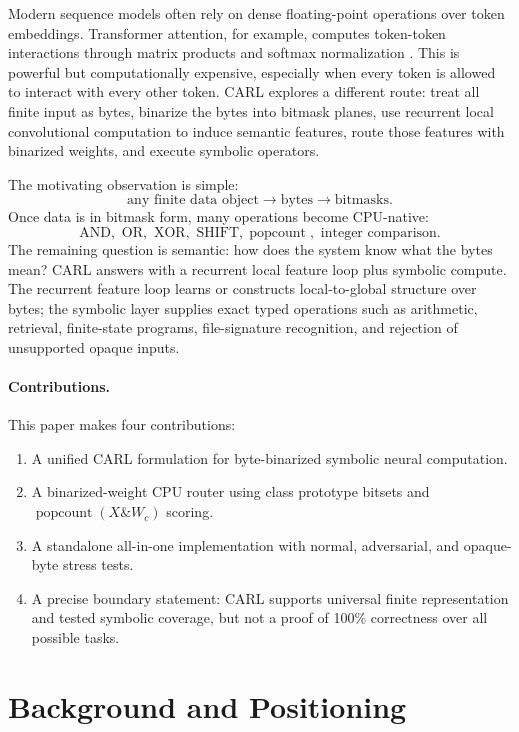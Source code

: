 \documentclass[10pt]{article}
\newcommand{\CARL}{\textsc{CARL}}
\newcommand{\popcount}{\operatorname{popcount}}
\begin{document}
Modern sequence models often rely on dense floating-point operations over token embeddings. Transformer attention, for example, computes token-token interactions through matrix products and softmax normalization \cite{vaswani2017attention}. This is powerful but computationally expensive, especially when every token is allowed to interact with every other token. \CARL{} explores a different route: treat all finite input as bytes, binarize the bytes into bitmask planes, use recurrent local convolutional computation to induce semantic features, route those features with binarized weights, and execute symbolic operators.

The motivating observation is simple:
\[
\text{any finite data object} \rightarrow \text{bytes} \rightarrow \text{bitmasks}.
\]
Once data is in bitmask form, many operations become CPU-native:
\[
\text{AND}, \text{ OR}, \text{ XOR}, \text{ SHIFT}, \popcount, \text{ integer comparison}.
\]
The remaining question is semantic: how does the system know what the bytes mean? \CARL{} answers with a recurrent local feature loop plus symbolic compute. The recurrent feature loop learns or constructs local-to-global structure over bytes; the symbolic layer supplies exact typed operations such as arithmetic, retrieval, finite-state programs, file-signature recognition, and rejection of unsupported opaque inputs.

\paragraph{Contributions.}
This paper makes four contributions:
\begin{enumerate}[leftmargin=1.5em]
  \item A unified \CARL{} formulation for byte-binarized symbolic neural computation.
  \item A binarized-weight CPU router using class prototype bitsets and \(\popcount(X \& W_c)\) scoring.
  \item A standalone all-in-one implementation with normal, adversarial, and opaque-byte stress tests.
  \item A precise boundary statement: \CARL{} supports universal finite representation and tested symbolic coverage, but not a proof of 100\% correctness over all possible tasks.
\end{enumerate}

\section{Background and Positioning}
\end{document}
